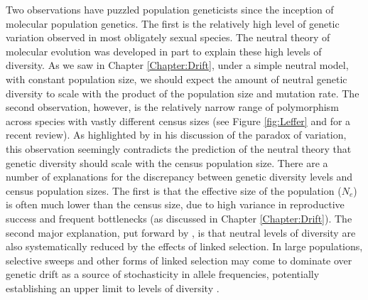  Two observations have puzzled population geneticists since the
inception of molecular population genetics. The first is the relatively high
level of genetic variation observed in most obligately sexual species.  
The neutral theory of molecular evolution was developed in part to
explain these high levels of diversity. As we saw in Chapter \ref{Chapter:Drift}, 
under a simple neutral model, with constant population size, we should expect the amount of neutral genetic
diversity to scale with the product of the population size and
mutation rate. The second observation, however, is the relatively narrow range 
of polymorphism across species with vastly different census sizes (see
Figure \ref{fig:Leffer} and \citet{leffler:12} for a recent review). 
As highlighted by \citet{Lewontin:74} in his discussion of the paradox
of variation, this observation seemingly contradicts the prediction of the neutral theory that
genetic diversity should scale with the census population size. There are a number of explanations for the discrepancy between genetic
diversity levels and census population sizes. The first is that the effective size of the population ($N_e$) is
often much lower than the census size, due to high variance in
reproductive success and frequent bottlenecks (as discussed in  Chapter \ref{Chapter:Drift}). 
The second major explanation,  put forward by \citet{MaynardSmith:74},
is that neutral levels of diversity are also systematically reduced by the effects of linked selection. 
In large populations, selective sweeps and other forms of linked selection may come to dominate over genetic drift as a
source of stochasticity in allele frequencies, potentially establishing an upper limit to levels of diversity \citep{Kaplan:89, Gillespie:00}. 

